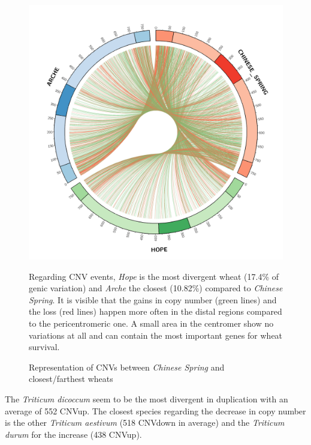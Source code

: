 \documentclass[a4paper, 12pt]{article}
\begin{document}
\begin{onehalfspace}
\begin{figure}
      \centering \includegraphics[scale=0.09]{Figures/Figure_15.png}
      \vspace{0.5cm}
      \caption{Representation of CNVs between \textit{Chinese Spring} and closest/farthest wheats}
      \label{fig:F15}
    \footnotesize{Regarding CNV events, \textit{Hope} is the most divergent wheat (17.4\% of genic variation) and \textit{Arche} the closest (10.82\%) compared to \textit{Chinese Spring}. It is visible that the gains in copy number (green lines) and the loss (red lines) happen more often in the distal regions compared to the pericentromeric one. A small area in the centromer show no variations at all and can contain the most important genes for wheat survival.}
    \end{figure}
\addtocounter{page}{-1}
\newpage
\clearpage 

The \textit{Triticum dicoccum} seem to be the most divergent in duplication with an average of 552 CNVup. The closest species regarding the decrease in copy number is the other \textit{Triticum aestivum} (518 CNVdown in average) and the \textit{Triticum durum} for the increase (438 CNVup).


\end{onehalfspace}
\end{document}
